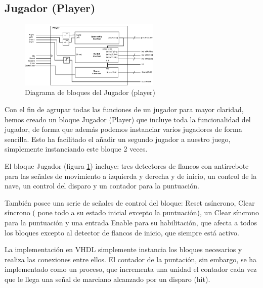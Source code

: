 \subsection{Jugador (Player)}
\label{player}

\begin{figure}[H]
	\centering
	\includegraphics[width=0.6\textwidth]{player_block.png}
	\caption{Diagrama de bloques del Jugador (player) }\label{fig:playerBlock}
\end{figure}

Con el fin de agrupar todas las funciones de un jugador para mayor claridad, hemos creado un bloque Jugador (Player) que incluye toda la funcionalidad del jugador, de forma que además podemos instanciar varios jugadores de forma sencilla. Esto ha facilitado el añadir un segundo jugador a nuestro juego, simplemente instanciando este bloque 2 veces.

El bloque Jugador (figura \ref{fig:playerBlock}) incluye: tres detectores de flancos con antirrebote para las señales de movimiento a izquierda y derecha y de inicio, un control de la nave, un control del disparo y un contador para la puntuación.

También posee una serie de señales de control del bloque: Reset asíncrono, Clear síncrono ( pone todo a su estado inicial excepto la puntuación), un Clear síncrono para la puntuación y una entrada Enable para su habilitación, que afecta a todos los bloques excepto al detector de flancos de inicio, que siempre está activo.

La implementación en VHDL simplemente instancia los bloques necesarios y realiza las conexiones entre ellos. El contador de la puntación, sin embargo, se ha implementado como un proceso, que incrementa una unidad el contador cada vez que le llega una señal de marciano alcanzado por un disparo (hit).

